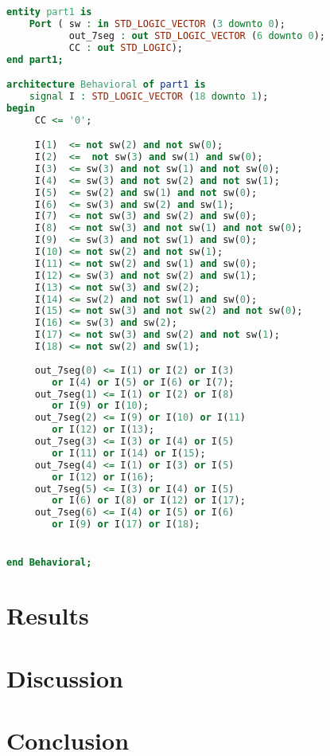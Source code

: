 \documentclass{article}
\begin{document}
\begin{lstlisting}[language=VHDL]
entity part1 is
    Port ( sw : in STD_LOGIC_VECTOR (3 downto 0);
           out_7seg : out STD_LOGIC_VECTOR (6 downto 0);
           CC : out STD_LOGIC);
end part1;

architecture Behavioral of part1 is
    signal I : STD_LOGIC_VECTOR (18 downto 1);
begin
     CC <= '0';

     I(1)  <= not sw(2) and not sw(0);
     I(2)  <=  not sw(3) and sw(1) and sw(0);
     I(3)  <= sw(3) and not sw(1) and not sw(0);
     I(4)  <= sw(3) and not sw(2) and not sw(1);
     I(5)  <= sw(2) and sw(1) and not sw(0);
     I(6)  <= sw(3) and sw(2) and sw(1);
     I(7)  <= not sw(3) and sw(2) and sw(0);
     I(8)  <= not sw(3) and not sw(1) and not sw(0);
     I(9)  <= sw(3) and not sw(1) and sw(0);
     I(10) <= not sw(2) and not sw(1);
     I(11) <= not sw(2) and sw(1) and sw(0);
     I(12) <= sw(3) and not sw(2) and sw(1);
     I(13) <= not sw(3) and sw(2);
     I(14) <= sw(2) and not sw(1) and sw(0);
     I(15) <= not sw(3) and not sw(2) and not sw(0);
     I(16) <= sw(3) and sw(2);
     I(17) <= not sw(3) and sw(2) and not sw(1);
     I(18) <= not sw(2) and sw(1);
     
     out_7seg(0) <= I(1) or I(2) or I(3)
        or I(4) or I(5) or I(6) or I(7);
     out_7seg(1) <= I(1) or I(2) or I(8)
        or I(9) or I(10);
     out_7seg(2) <= I(9) or I(10) or I(11)
        or I(12) or I(13);
     out_7seg(3) <= I(3) or I(4) or I(5)
        or I(11) or I(14) or I(15);
     out_7seg(4) <= I(1) or I(3) or I(5)
        or I(12) or I(16);
     out_7seg(5) <= I(3) or I(4) or I(5)
        or I(6) or I(8) or I(12) or I(17);
     out_7seg(6) <= I(4) or I(5) or I(6)
        or I(9) or I(17) or I(18);


end Behavioral;
\end{lstlisting}


\section{Results}


\section{Discussion}


\section{Conclusion}
\end{document}
